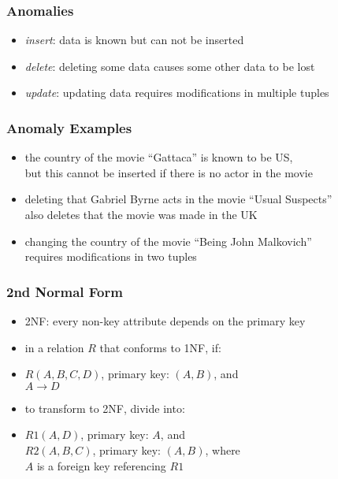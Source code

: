 \documentclass[dvipsnames]{beamer}
\begin{document}
\begin{frame}
  \frametitle{Anomalies}

  \begin{itemize}
    \item \emph{insert}: data is known but can not be inserted

    \medskip
    \item \emph{delete}: deleting some data causes some other data to be lost

    \medskip
    \item \emph{update}: updating data requires modifications in multiple tuples
  \end{itemize}
\end{frame}

\begin{frame}
  \frametitle{Anomaly Examples}

  \hyperlink{example_db_1}{}

  \begin{itemize}
    \item the country of the movie ``Gattaca'' is known to be US,\\
      but this cannot be inserted if there is no actor in the movie

    \pause
    \medskip
    \item deleting that Gabriel Byrne acts in the movie ``Usual Suspects''\\
      also deletes that the movie was made in the UK

    \pause
    \medskip
    \item changing the country of the movie ``Being John Malkovich''\\
      requires modifications in two tuples
  \end{itemize}
\end{frame}

\begin{frame}
  \frametitle{2nd Normal Form}

  \begin{itemize}
    \item \alert{2NF}: every non-key attribute depends on the primary key

    \pause
    \medskip
    \item in a relation $R$ that conforms to 1NF, if:
    \item $R(A,B,C,D)$, primary key: $(A,B)$, and\\
      $A \rightarrow D$

    \medskip
    \item to transform to 2NF, divide into:
    \item $R1(A,D)$, primary key: $A$, and\\
      $R2(A,B,C)$, primary key: $(A,B)$, where\\
      $A$ is a foreign key referencing $R1$
  \end{itemize}
\end{frame}
\end{document}

